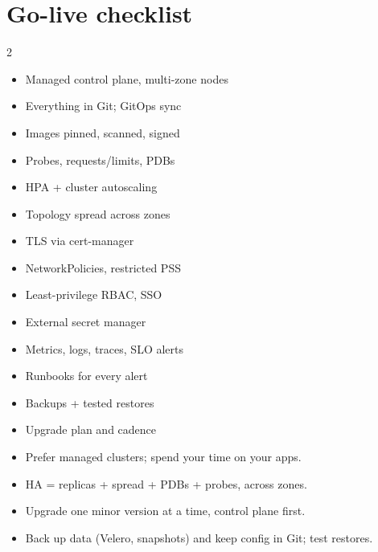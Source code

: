 \section{Go-live checklist}

\begin{multicols}{2}
\begin{itemize}
  \item[\textcolor{k8sblue}{\faCheckSquare}] Managed control plane, multi-zone nodes
  \item[\textcolor{k8sblue}{\faCheckSquare}] Everything in Git; GitOps sync
  \item[\textcolor{k8sblue}{\faCheckSquare}] Images pinned, scanned, signed
  \item[\textcolor{k8sblue}{\faCheckSquare}] Probes, requests/limits, PDBs
  \item[\textcolor{k8sblue}{\faCheckSquare}] HPA + cluster autoscaling
  \item[\textcolor{k8sblue}{\faCheckSquare}] Topology spread across zones
  \item[\textcolor{k8sblue}{\faCheckSquare}] TLS via cert-manager
  \item[\textcolor{k8sblue}{\faCheckSquare}] NetworkPolicies, restricted PSS
  \item[\textcolor{k8sblue}{\faCheckSquare}] Least-privilege RBAC, SSO
  \item[\textcolor{k8sblue}{\faCheckSquare}] External secret manager
  \item[\textcolor{k8sblue}{\faCheckSquare}] Metrics, logs, traces, SLO alerts
  \item[\textcolor{k8sblue}{\faCheckSquare}] Runbooks for every alert
  \item[\textcolor{k8sblue}{\faCheckSquare}] Backups + tested restores
  \item[\textcolor{k8sblue}{\faCheckSquare}] Upgrade plan and cadence
\end{itemize}
\end{multicols}

\begin{recap}
\begin{itemize}
  \item Prefer managed clusters; spend your time on your apps.
  \item HA = replicas + spread + PDBs + probes, across zones.
  \item Upgrade one minor version at a time, control plane first.
  \item Back up data (Velero, snapshots) and keep config in Git; test restores.
\end{itemize}
\end{recap}
